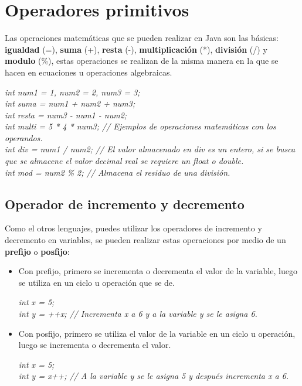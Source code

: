 \section{Operadores primitivos}
\hspace{0.55cm}Las operaciones matemáticas que se pueden realizar en Java son las básicas: \textbf{igualdad} (=), \textbf{suma} (+), \textbf{resta} (-), \textbf{multiplicación} (*), \textbf{división} (/) y \textbf{modulo} (\%), estas operaciones se realizan de la misma manera en la que se hacen en ecuaciones u operaciones algebraicas.
\begin{center}
    \textit{
        int num1 = 1, num2 = 2, num3 = 3; \\
        int suma = num1 + num2 + num3; \\
        int resta = num3 - num1 - num2; \\
        int multi = 5 * 4 * num3; // Ejemplos de operaciones matemáticas con los operandos. \\
        int div = num1 / num2; // El valor almacenado en div es un entero, si se busca que se almacene el valor decimal real se requiere un float o double. \\
        int mod = num2 \% 2; // Almacena el residuo de una división.
    }
\end{center}


\subsection{Operador de incremento y decremento}
\hspace{0.55cm}Como el otros lenguajes, puedes utilizar los operadores de incremento y decremento en variables, se pueden realizar estas operaciones por medio de un \textbf{prefijo} o \textbf{posfijo}:
\begin{itemize}
    \item Con prefijo, primero se incrementa o decrementa el valor de la variable, luego se utiliza en un ciclo u operación que se de.
    \begin{center}
        \textit{
            int x = 5; \\
            int y = ++x; // Incrementa x a 6 y a la variable y se le asigna 6.
        }
    \end{center}
    \item Con posfijo, primero se utiliza el valor de la variable en un ciclo u operación, luego se incrementa o decrementa el valor.
    \begin{center}
        \textit{
            int x = 5; \\
            int y = x++; // A la variable y se le asigna 5 y después incrementa x a 6.
        }
    \end{center}
\end{itemize}


